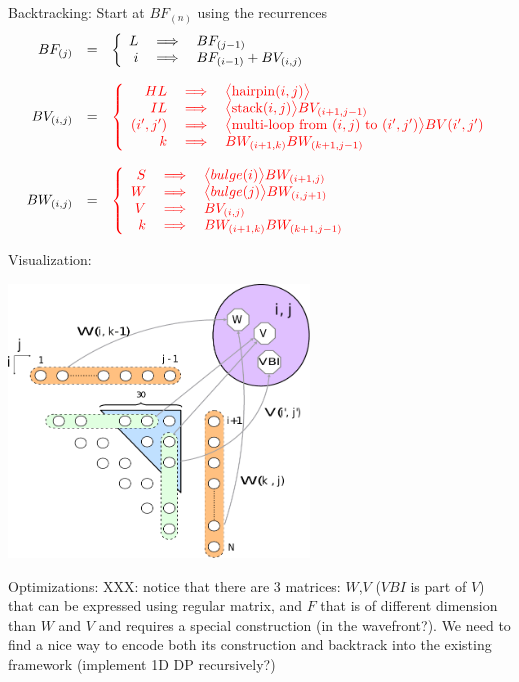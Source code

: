\item Backtracking: Start at $BF_{(n)}$ using the recurrences
 \[\begin{array}{rcl}
	BF_{(j)} &=& \left\{\begin{array}{rcl} L&\implies& BF_{(j-1)} \\ i &\implies& BF_{(i-1)} + BV_{(i,j)} \end{array} \right.\\
	\\
	BV_{(i,j)} &=& \color{red} \left\{\begin{array}{rcl}
		HL &\implies&\big< {\rm hairpin}(i,j) \big> \\
		IL &\implies& \big< {\rm stack}(i,j) \big> BV_{(i+1,j-1)} \\
		(i',j') &\implies& \big< \text{multi-loop from $(i,j)$ to }(i',j') \big> BV(i',j')\\
		k &\implies& BW_{(i+1,k)} BW_{(k+1,j-1)}
	\end{array}\right.\\
	\\
	BW_{(i,j)} &=& \color{red} \left\{\begin{array}{rcl}
	S & \implies & \big< bulge(i) \big> BW_{(i+1,j)} \\
	W & \implies & \big< bulge(j) \big> BW_{(i,j+1)} \\
	V &\implies& BV_{(i,j)} \\
	k &\implies& BW_{(i+1,k)} BW_{(k+1,j-1)}
	\end{array}\right.
\end{array}\]

\item Visualization: \begin{center}\includegraphics[width=8cm]{problems_zucker.pdf}\end{center}
\item Optimizations: {\color{red} XXX: notice that there are 3 matrices: $W$,$V$ ($VBI$ is part of $V$) that can be expressed using regular matrix, and $F$ that is of different dimension than $W$ and $V$ and requires a special construction (in the wavefront?). We need to find a nice way to encode both its construction and backtrack into the existing framework (implement 1D DP recursively?)}
\ole

